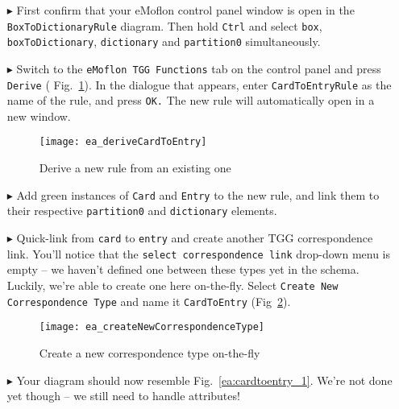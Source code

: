 \begin{enumerate}
  
\item[$\blacktriangleright$] First confirm that your eMoflon control panel window is open in the \texttt{Box\-To\-Dictionary\-Rule} diagram. Then hold
\texttt{Ctrl} and select \texttt{box}, \texttt{box\-To\-Dictionary},
\texttt{dictionary} and \texttt{partition0} simultaneously.
  
\item[$\blacktriangleright$] Switch to the \texttt{eMoflon TGG Functions} tab on the control panel and press \texttt{Derive} (
Fig.~\ref{ea:derive_from_tgg_rule}). In the dialogue that appears, enter \texttt{Card\-To\-Ent\-ry\-Rule} as the name of the rule, and press \texttt{OK.} The
new rule will automatically open in a new window.

\begin{figure}[htbp]
\begin{center}
 \texttt{[image: ea\_deriveCardToEntry]}
  \caption{Derive a new rule from an existing one}
  \label{ea:derive_from_tgg_rule}
\end{center}
\end{figure}
\FloatBarrier

\item[$\blacktriangleright$] Add green instances of \texttt{Card} and \texttt{Entry} to the new rule, and link them to their respective \texttt{partition0} and
\texttt{dictionary} elements. 

\vspace{0.5cm}

\item[$\blacktriangleright$] Quick-link from \texttt{card} to \texttt{entry} and create another TGG correspondence link. You'll notice that the
\texttt{select correspondence link} drop-down menu is empty -- we haven't defined one between these types yet in the schema. Luckily, we're able to create one
here on-the-fly. Select \texttt{Create New Correspondence Type} and name it \texttt{CardToEntry} (Fig~\ref{ea:newCorrespondenceDialogue}). 

\vspace{0.5cm}

\begin{figure}[htbp]
\begin{center}
 \texttt{[image: ea\_createNewCorrespondenceType]}
  \caption{Create a new correspondence type on-the-fly}
  \label{ea:newCorrespondenceDialogue}
\end{center}
\end{figure}

\item[$\blacktriangleright$] Your diagram should now resemble Fig.~\ref{ea:cardtoentry_1}. We're not done yet though -- we still need to handle attributes!

\end{enumerate}

